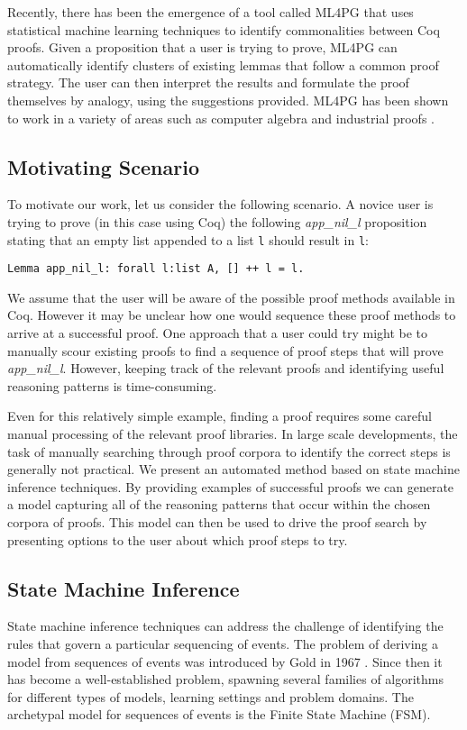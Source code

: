 \documentclass{llncs}
\begin{document}
Recently, there has been the emergence of a tool called ML4PG \cite{ML4PG13} that uses statistical machine learning techniques to identify commonalities between Coq proofs. Given a proposition that a user is trying to prove, ML4PG can automatically identify clusters of existing lemmas that follow a common proof strategy. The user can then interpret the results and formulate the proof themselves by analogy, using the suggestions provided. ML4PG has been shown to work in a variety of areas such as computer algebra \cite{ML4PGAlg} and industrial proofs \cite{ML4PGACL2}.

\subsection{Motivating Scenario}
To motivate our work, let us consider the following scenario. A novice user is trying to prove (in this case using Coq) the following \emph{app\_nil\_l} proposition stating that an empty list appended to a list {\tt l} should result in {\tt l}:

\vspace{2mm}
\noindent\texttt{Lemma app\_nil\_l: forall l:list A, [] ++ l = l.}

\vspace{2mm}
We assume that the user will be aware of the possible proof methods available in Coq. However it may be unclear how one would sequence these proof methods to arrive at a successful proof. One approach that a user could try might be to manually scour existing proofs to find a sequence of proof steps that will prove \emph{app\_nil\_l}. However, keeping track of the relevant proofs and identifying useful reasoning patterns is time-consuming.

Even for this relatively simple example, finding a proof requires some careful manual processing of the relevant proof libraries. In large scale developments, the task of manually searching through proof corpora to identify the correct steps is generally not practical. We present an automated method based on state machine inference techniques. By providing examples of successful proofs we can generate a model capturing all of the reasoning patterns that occur within the chosen corpora of proofs. This model can then be used to drive the proof search by presenting options to the user about which proof steps to try.

\subsection{State Machine Inference}
State machine inference techniques can address the challenge of identifying the rules that govern a particular sequencing of events. The problem of deriving a model from sequences of events was introduced by Gold in 1967 \cite{Gold67}. Since then it has become a well-established problem, spawning several families of algorithms for different types of models, learning settings and problem domains. The archetypal model for sequences of events is the Finite State Machine (FSM).
\end{document}
